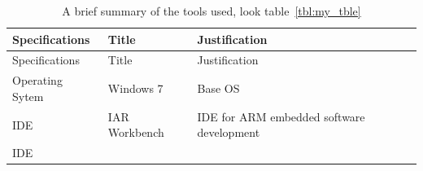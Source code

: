 \documentclass[]{book}
\begin{document}
\begin{longtable}[]{@{}lll@{}}
\caption{A brief summary of the tools used, look
table~\ref{tbl:my_tble}}\tabularnewline
\toprule
\begin{minipage}[b]{0.13\columnwidth}\raggedright\strut
Specifications\strut
\end{minipage} & \begin{minipage}[b]{0.13\columnwidth}\raggedright\strut
Title\strut
\end{minipage} & \begin{minipage}[b]{0.64\columnwidth}\raggedright\strut
Justification\strut
\end{minipage}\tabularnewline
\midrule
\endfirsthead
\toprule
\begin{minipage}[b]{0.13\columnwidth}\raggedright\strut
Specifications\strut
\end{minipage} & \begin{minipage}[b]{0.13\columnwidth}\raggedright\strut
Title\strut
\end{minipage} & \begin{minipage}[b]{0.64\columnwidth}\raggedright\strut
Justification\strut
\end{minipage}\tabularnewline
\midrule
\endhead
\begin{minipage}[t]{0.13\columnwidth}\raggedright\strut
Operating Sytem\strut
\end{minipage} & \begin{minipage}[t]{0.13\columnwidth}\raggedright\strut
Windows 7\strut
\end{minipage} & \begin{minipage}[t]{0.64\columnwidth}\raggedright\strut
Base OS\strut
\end{minipage}\tabularnewline
\begin{minipage}[t]{0.13\columnwidth}\raggedright\strut
IDE\strut
\end{minipage} & \begin{minipage}[t]{0.13\columnwidth}\raggedright\strut
IAR Workbench\strut
\end{minipage} & \begin{minipage}[t]{0.64\columnwidth}\raggedright\strut
IDE for ARM embedded software development\strut
\end{minipage}\tabularnewline
\begin{minipage}[t]{0.13\columnwidth}\raggedright\strut
IDE\strut
\end{minipage} & \begin{minipage}[t]{0.13\columnwidth}\raggedright\strut

\end{minipage}
\end{longtable}
\end{document}
